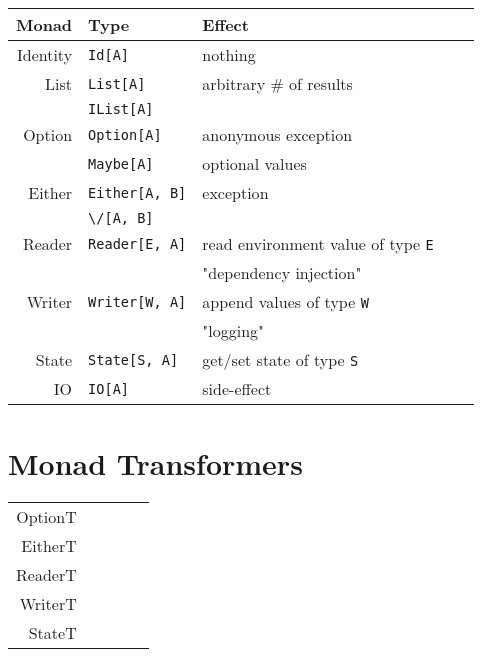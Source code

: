 \documentclass{tufte-handout}
\begin{document}
\begin{table}[ht]
  \centering
  \selectfont
  \begin{tabular}{rllll}
    Monad & Type & Effect\footnotemark[1] \\
    \midrule
    Identity & \texttt{Id[A]} & nothing \\
    List  & \texttt{List[A]}\footnotemark[2]          & arbitrary \# of results \\
    & \verb$IList[A]$ & \\
    Option & \texttt{Option[A]}\footnotemark[2]       & anonymous exception \\
    & \verb$Maybe[A]$ & optional values \\
    Either & \texttt{Either[A, B]}\footnotemark[2]        & exception \\
    & \verb$\/[A, B]$ & \\
    Reader & \texttt{Reader[E, A]}       & read environment value of type \verb$E$  \\
                 & & "dependency injection" \\
    Writer & \texttt{Writer[W, A]}        & append values of type \verb$W$ \\
              & & "logging" \\
    State & \texttt{State[S, A]}      & get/set state of type \verb$S$ \\
    IO  & \texttt{IO[A]}         & side-effect\footnotemark[3]  \\
  \end{tabular}
  \label{tab:normaltab}
\end{table}





\section{Monad Transformers}\label{sec:monadtrans}

\begin{table}[ht]
  \centering
  \selectfont
  \begin{tabular}{rllll}
  OptionT \\
  EitherT \\
  ReaderT \\
  WriterT \\
  StateT \\
  \end{tabular}
  \label{tab:normaltab}
\end{table}




\end{document}
